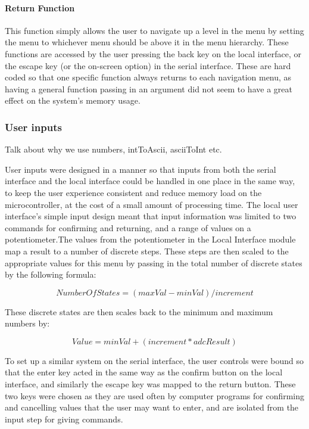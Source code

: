 \documentclass[]{report}
\begin{document}
\paragraph{Return Function}
This function simply allows the user to navigate up a level in the menu by setting the menu to whichever menu should be above it in the menu hierarchy. These functions are accessed by the user pressing the back key on the local interface, or the escape key (or the on-screen option) in the serial interface. These are hard coded so that one specific function always returns to each navigation menu, as having a general function passing in an argument did not seem to have a great effect on the system's memory usage. 

\subsubsection{User inputs}
Talk about why we use numbers, intToAscii, asciiToInt etc.

User inputs were designed in a manner so that inputs from both the serial interface and the local interface could be handled in one place in the same way, to keep the user experience consistent and reduce memory load on the microcontroller, at the cost of a small amount of processing time. The local user interface's simple input design meant that input information was limited to two commands for confirming and returning, and a range of values on a potentiometer.The values from the potentiometer in the Local Interface module map a result to a number of discrete steps. These steps are then scaled to the appropriate values for this menu by passing in the total number of discrete states by the following formula:

\begin{equation}
NumberOfStates = (maxVal-minVal)/increment
\end{equation}

These discrete states are then scales back to the minimum and maximum numbers by:

\begin{equation}
Value = minVal + (increment * adcResult)
\end{equation}

To set up a similar system on the serial interface, the user controls were bound so that the enter key acted in the same way as the confirm button on the local interface, and similarly the escape key was mapped to the return button. These two keys were chosen as they are used often by computer programs for confirming and cancelling values that the user may want to enter, and are isolated from the input step for giving commands. 
\end{document}

